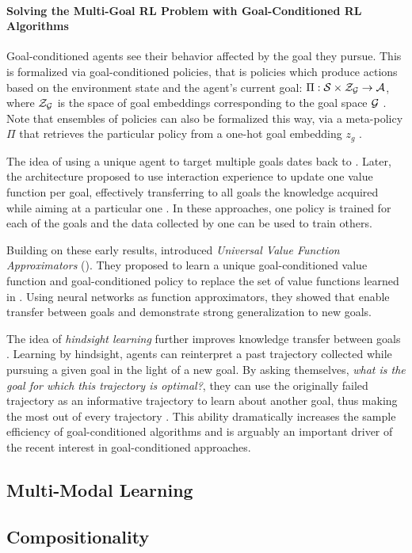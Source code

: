 \paragraph{Solving the Multi-Goal RL Problem with Goal-Conditioned RL Algorithms}
Goal-conditioned agents see their behavior affected by the goal they pursue. This is formalized via goal-conditioned policies, that is policies which produce actions based on the environment state and the agent's current goal: $\Pi:\mathcal{S}\times\mathcal{Z}_{\mathcal{G}}\to\mathcal{A}$, where $\mathcal{Z}_{\mathcal{G}}$ is the space of goal embeddings corresponding to the goal space $\mathcal{G}$ \cite{schaul2015universal}. Note that ensembles of policies can also be formalized this way, via a meta-policy $\Pi$ that retrieves the particular policy from a one-hot goal embedding $z_g$ \cite{kaelbling1993learning,sutton2011horde}.

The idea of using a unique \rl agent to target multiple goals dates back to \cite{kaelbling1993learning}. Later, the \horde architecture proposed to use interaction experience to update one value function per goal, effectively transferring to all goals the knowledge acquired while aiming at a particular one \cite{sutton2011horde}. In these approaches, one policy is trained for each of the goals and the data collected by one can be used to train others.

Building on these early results, \cite{schaul2015universal} introduced \textit{Universal Value Function Approximators} (\uvfa). They proposed to learn a unique goal-conditioned value function and goal-conditioned policy to replace the set of value functions learned in \horde. Using neural networks as function approximators, they showed that \uvfas enable transfer between goals and demonstrate strong generalization to new goals.

The idea of \textit{hindsight learning} further improves knowledge transfer between goals \cite{kaelbling1993learning,andrychowicz2017hindsight}. Learning by hindsight, agents can reinterpret a past trajectory collected while pursuing a given goal in the light of a new goal. By asking themselves, \textit{what is the goal for which this trajectory is optimal?}, they can use the originally failed trajectory as an informative trajectory to learn about another goal, thus making the most out of every trajectory \cite{eysenbach2020rewriting}. This ability dramatically increases the sample efficiency of goal-conditioned algorithms and is arguably an important driver of the recent interest in goal-conditioned \rl approaches.


\subsection{Multi-Modal Learning}
\subsection{Compositionality}